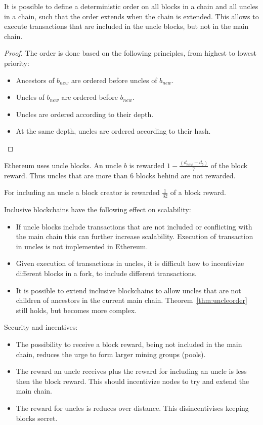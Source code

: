 \begin{theorem}
	\label{thm:uncleorder}
It is possible to define a deterministic order on all blocks in a chain and all uncles in a chain, such that the order extends when the chain is extended.
This allows to execute transactions that are included in the uncle blocks, but not in the main chain.
\end{theorem}

\begin{proof}
	The order is done based on the following principles, from highest to lowest priority:
	\begin{itemize}
		\item Ancestors of $b_{new}$ are ordered before uncles of $b_{new}$.
		\item Uncles of $b_{new}$ are ordered before $b_{new}$.
		\item Uncles are ordered according to their depth.
		\item At the same depth, uncles are ordered according to their hash.
	\end{itemize}
\end{proof}

\begin{example}
Ethereum uses uncle blocks. An uncle $b$ is rewarded $1-\frac{(d_{new}-d_b)}{7}$ of the block reward. Thus uncles that are more than 6 blocks behind are not rewarded.

For including an uncle a block creator is rewarded $\frac{1}{32}$ of a block reward.
\end{example}

\begin{note}
Inclusive blockchains have the following effect on scalability:
\begin{itemize}
	\item If uncle blocks include transactions that are not included or conflicting with the main chain this can further increase scalability. Execution of transaction in uncles is not implemented in Ethereum.
	\item Given execution of transactions in uncles, it is difficult how to incentivize different blocks in a fork, to include different transactions.
	\item It is possible to extend inclusive blockchains to allow uncles that are not children of ancestors in the current main chain. Theorem~\ref{thm:uncleorder} still holds, but becomes more complex.
\end{itemize}

Security and incentives:
\begin{itemize}
	\item The possibility to receive a block reward, being not included in the main chain, reduces the urge to form larger mining groups (pools).
	\item The reward an uncle receives plus the reward for including an uncle is less then the block reward. This should incentivize nodes to try and extend the main chain.
	\item The reward for uncles is reduces over distance. This disincentivises keeping blocks secret. 
\end{itemize}
\end{note}

